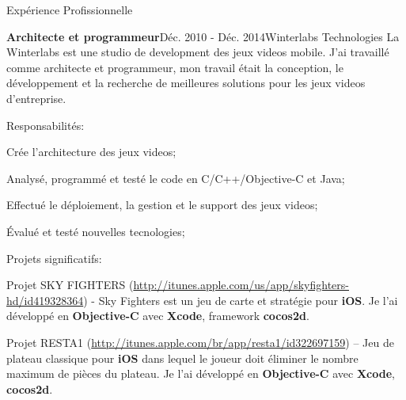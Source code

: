 \documentclass{resume}
\begin{document}
\begin{rSection}{Expérience Profissionnelle}
    \begin{rSubsection}{\bf Architecte et programmeur}{Déc. 2010 - Déc. 2014}{Winterlabs Technologies}{}
      La Winterlabs est une studio de development des jeux videos mobile. J'ai travaillé comme architecte et programmeur, mon travail était la conception, le développement et la recherche de meilleures solutions pour les jeux videos d'entreprise.
    \end{rSubsection}
    \begin{rSubsection}{Responsabilités:}{}{}{}
      \item Crée l’architecture des jeux videos;
      \item Analysé, programmé et testé le code en C/C++/Objective-C et Java;
      \item Effectué le déploiement, la gestion et le support des jeux videos;
      \item Évalué et testé nouvelles tecnologies;
    \end{rSubsection}
    \begin{rSubsection}{Projets significatifs:}{}{}{}
      \item Projet SKY FIGHTERS (\url{http://itunes.apple.com/us/app/skyfighters-hd/id419328364}) - Sky Fighters est un jeu de carte et stratégie pour \textbf{iOS}. Je l’ai développé en \textbf{Objective-C} avec \textbf{Xcode}, framework \textbf{cocos2d}. \\
      \item Projet RESTA1 (\url{http://itunes.apple.com/br/app/resta1/id322697159}) – Jeu de plateau classique pour \textbf{iOS} dans lequel le joueur doit éliminer le nombre maximum de pièces du plateau. Je l’ai développé en \textbf{Objective-C} avec \textbf{Xcode}, \textbf{cocos2d}.

\end{rSubsection}
\end{rSection}
\end{document}
